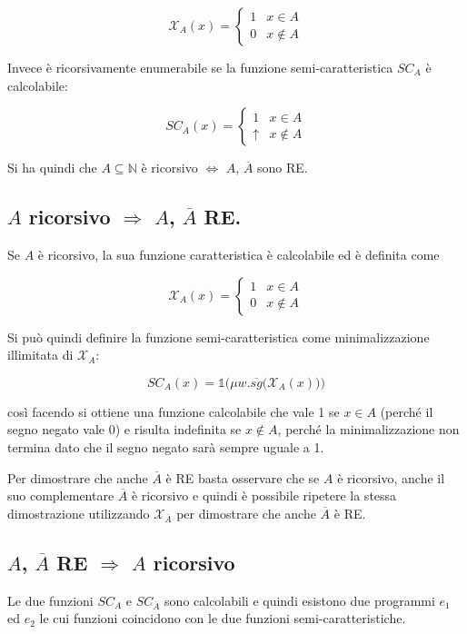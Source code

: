 $$
\mathcal{X}_A(x) = \begin{cases}
1 &x \in A \\
0 &x \notin A
\end{cases} 
$$

Invece è ricorsivamente enumerabile se la funzione semi-caratteristica $SC_A$ è calcolabile:

$$
SC_A(x) = \begin{cases}
1 &x \in A \\
\uparrow &x \notin A
\end{cases} 
$$

Si ha quindi che $A \subseteq \mathbb{N}$ è ricorsivo $\Leftrightarrow$ $A$, $\overline{A}$ sono RE.

\subsection{$A$ ricorsivo $\Rightarrow$ $A$, $\overline{A}$ RE. }

Se $A$ è ricorsivo, la sua funzione caratteristica è calcolabile ed è definita come

$$
\mathcal{X}_A(x) = \begin{cases}
1 &x \in A \\
0 &x \notin A
\end{cases} 
$$

Si può quindi definire la funzione semi-caratteristica come minimalizzazione illimitata di $\mathcal{X}_A$:

$$
SC_A(x) = \mathbb{1} \Bigg( \mu w. \overline{sg} \Big( \mathcal{X}_A(x) \Big) \Bigg)
$$

così facendo si ottiene una funzione calcolabile che vale 1 se $x \in A$ (perché il segno negato vale 0) e risulta indefinita se $x \notin A$, perché la minimalizzazione non termina dato che il segno negato sarà sempre uguale a 1.

Per dimostrare che anche $\overline{A}$ è RE basta osservare che se $A$ è ricorsivo, anche il suo complementare $\overline{A}$ è ricorsivo e quindi è possibile ripetere la stessa dimostrazione utilizzando $\mathcal{X}_{\overline{A}}$ per dimostrare che anche $\overline{A}$ è RE.

\subsection{$A$, $\overline{A}$ RE $\Rightarrow$ $A$ ricorsivo}

Le due funzioni $SC_A$ e $SC_{\overline{A}}$ sono calcolabili e quindi esistono due programmi $e_1$ ed $e_2$ le cui funzioni coincidono con le due funzioni semi-caratteristiche.

